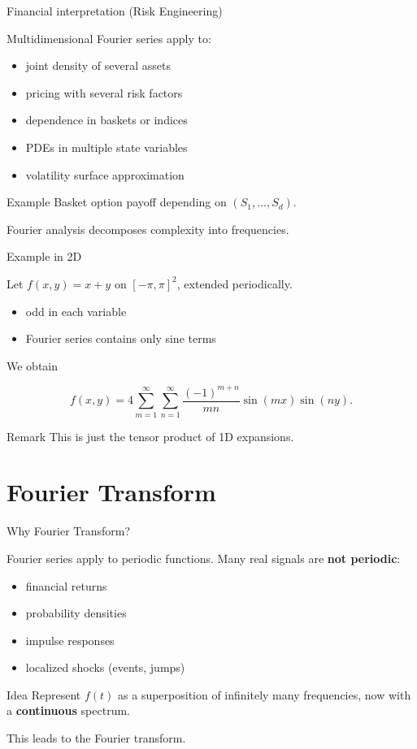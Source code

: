 \documentclass[aspectratio=169]{beamer}
\begin{document}
\begin{frame}{Financial interpretation (Risk Engineering)}

Multidimensional Fourier series apply to:

\begin{itemize}
    \item joint density of several assets
    \item pricing with several risk factors
    \item dependence in baskets or indices
    \item PDEs in multiple state variables
    \item volatility surface approximation
\end{itemize}

\begin{block}{Example}
Basket option payoff depending on $(S_1,\dots,S_d)$.
\end{block}

Fourier analysis decomposes complexity into frequencies.
\end{frame}

\begin{frame}{Example in 2D}

Let $f(x,y)=x+y$ on $[-\pi,\pi]^2$,
extended periodically.

\begin{itemize}
    \item odd in each variable
    \item Fourier series contains only sine terms
\end{itemize}

We obtain

\[
f(x,y)=
4\sum_{m=1}^{\infty}\sum_{n=1}^{\infty}
\frac{(-1)^{m+n}}{mn}
\sin(mx)\sin(ny).
\]

\begin{block}{Remark}
This is just the tensor product of 1D expansions.
\end{block}

\end{frame}


\section{Fourier Transform}

\begin{frame}{Why Fourier Transform?}

Fourier series apply to periodic functions.
\pause
Many real signals are \textbf{not periodic}:
\begin{itemize}
    \item financial returns
    \item probability densities
    \item impulse responses
    \item localized shocks (events, jumps)
\end{itemize}
\pause
\begin{block}{Idea}
Represent $f(t)$ as a superposition of infinitely many frequencies,
now with a \textbf{continuous} spectrum.
\end{block}

This leads to the Fourier transform.
\end{frame}
\end{document}
